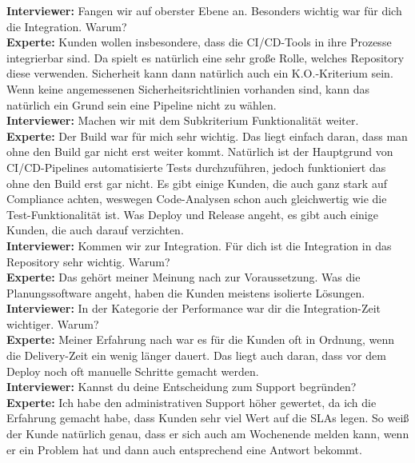 \begin{center}
\begin{figure}[H]
    \centering
    \label{fig:gew_53}
\end{figure}	
\end{center}
\newpage
\resetlinenumber
\begin{linenumbers}
    \textbf{Interviewer:} Fangen wir auf oberster Ebene an. Besonders wichtig war für dich die Integration. Warum?\\
    \textbf{Experte:} Kunden wollen insbesondere, dass die CI/CD-Tools in ihre Prozesse integrierbar sind. Da spielt es natürlich eine sehr große Rolle, welches Repository diese verwenden. Sicherheit kann dann natürlich auch ein K.O.-Kriterium sein. Wenn keine angemessenen Sicherheitsrichtlinien vorhanden sind, kann das natürlich ein Grund sein eine Pipeline nicht zu wählen. \\
    \textbf{Interviewer:} Machen wir mit dem Subkriterium Funktionalität weiter.\\
    \textbf{Experte:} Der Build war für mich sehr wichtig. Das liegt einfach daran, dass man ohne den Build gar nicht erst weiter kommt. Natürlich ist der Hauptgrund von CI/CD-Pipelines automatisierte Tests durchzuführen, jedoch funktioniert das ohne den Build erst gar nicht. Es gibt einige Kunden, die auch ganz stark auf Compliance achten, weswegen Code-Analysen schon auch gleichwertig wie die Test-Funktionalität ist. Was Deploy und Release angeht, es gibt auch einige Kunden, die auch darauf verzichten.\\
    \textbf{Interviewer:} Kommen wir zur Integration. Für dich ist die Integration in das Repository sehr wichtig. Warum?\\
    \textbf{Experte:} Das gehört meiner Meinung nach zur Voraussetzung. Was die Planungssoftware angeht, haben die Kunden meistens isolierte Lösungen.\\ 
    \textbf{Interviewer:} In der Kategorie der Performance war dir die Integration-Zeit wichtiger. Warum?\\
    \textbf{Experte:} Meiner Erfahrung nach war es für die Kunden oft in Ordnung, wenn die Delivery-Zeit ein wenig länger dauert. Das liegt auch daran, dass vor dem Deploy noch oft manuelle Schritte gemacht werden.\\
    \textbf{Interviewer:} Kannst du deine Entscheidung zum Support begründen?\\
    \textbf{Experte:} Ich habe den administrativen Support höher gewertet, da ich die Erfahrung gemacht habe, dass Kunden sehr viel Wert auf die SLAs legen. So weiß der Kunde natürlich genau, dass er sich auch am Wochenende melden kann, wenn er ein Problem hat und dann auch entsprechend eine Antwort bekommt. \\

\end{linenumbers}
